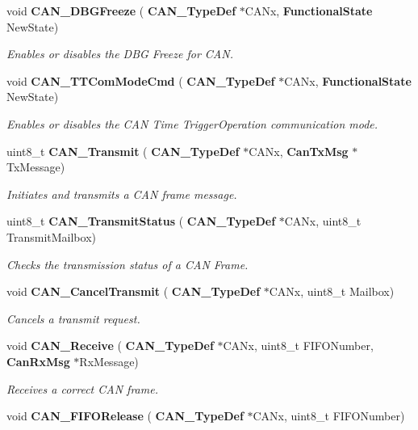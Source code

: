 \begin{DoxyCompactItemize}
void \textbf{ C\+A\+N\+\_\+\+D\+B\+G\+Freeze} (\textbf{ C\+A\+N\+\_\+\+Type\+Def} $\ast$C\+A\+Nx, \textbf{ Functional\+State} New\+State)
\begin{DoxyCompactList}\small\item\em Enables or disables the D\+BG Freeze for C\+AN. \end{DoxyCompactList}\item 
void \textbf{ C\+A\+N\+\_\+\+T\+T\+Com\+Mode\+Cmd} (\textbf{ C\+A\+N\+\_\+\+Type\+Def} $\ast$C\+A\+Nx, \textbf{ Functional\+State} New\+State)
\begin{DoxyCompactList}\small\item\em Enables or disables the C\+AN Time Trigger\+Operation communication mode. \end{DoxyCompactList}\item 
uint8\+\_\+t \textbf{ C\+A\+N\+\_\+\+Transmit} (\textbf{ C\+A\+N\+\_\+\+Type\+Def} $\ast$C\+A\+Nx, \textbf{ Can\+Tx\+Msg} $\ast$Tx\+Message)
\begin{DoxyCompactList}\small\item\em Initiates and transmits a C\+AN frame message. \end{DoxyCompactList}\item 
uint8\+\_\+t \textbf{ C\+A\+N\+\_\+\+Transmit\+Status} (\textbf{ C\+A\+N\+\_\+\+Type\+Def} $\ast$C\+A\+Nx, uint8\+\_\+t Transmit\+Mailbox)
\begin{DoxyCompactList}\small\item\em Checks the transmission status of a C\+AN Frame. \end{DoxyCompactList}\item 
void \textbf{ C\+A\+N\+\_\+\+Cancel\+Transmit} (\textbf{ C\+A\+N\+\_\+\+Type\+Def} $\ast$C\+A\+Nx, uint8\+\_\+t Mailbox)
\begin{DoxyCompactList}\small\item\em Cancels a transmit request. \end{DoxyCompactList}\item 
void \textbf{ C\+A\+N\+\_\+\+Receive} (\textbf{ C\+A\+N\+\_\+\+Type\+Def} $\ast$C\+A\+Nx, uint8\+\_\+t F\+I\+F\+O\+Number, \textbf{ Can\+Rx\+Msg} $\ast$Rx\+Message)
\begin{DoxyCompactList}\small\item\em Receives a correct C\+AN frame. \end{DoxyCompactList}\item 
void \textbf{ C\+A\+N\+\_\+\+F\+I\+F\+O\+Release} (\textbf{ C\+A\+N\+\_\+\+Type\+Def} $\ast$C\+A\+Nx, uint8\+\_\+t F\+I\+F\+O\+Number)

\end{DoxyCompactItemize}
